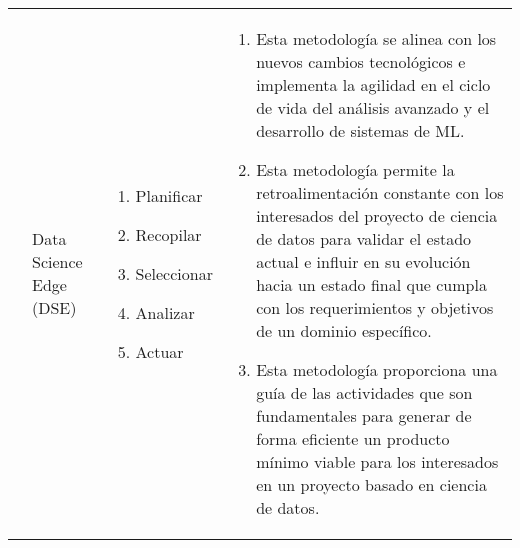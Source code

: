 \begin{table*} [!htb]
\begin{threeparttable}
\begin{tabular}{p{1cm} p{2cm} p{5cm} p{6.5cm}}
			\cite{Grady2017}
			&Data Science Edge (DSE)
			&  \begin{enumerate}
				\item Planificar
				\item Recopilar
				\item Seleccionar
				\item Analizar
				\item Actuar
			\end{enumerate}
			& \begin{enumerate}
				\item Esta metodología se alinea con los nuevos cambios tecnológicos e implementa la agilidad en el ciclo de vida del análisis avanzado y el desarrollo de sistemas de ML.
				\item Esta metodología permite la retroalimentación constante con los interesados del proyecto de ciencia de datos para validar el estado actual e influir en su evolución hacia un estado final que cumpla con los requerimientos y objetivos de un dominio específico.
				\item Esta metodología proporciona una guía de las actividades que son fundamentales para generar de forma eficiente un producto mínimo viable para los interesados en un proyecto basado en ciencia de datos.
			\end{enumerate}
		\end{tabular}
	\end{threeparttable}
\end{table*}

